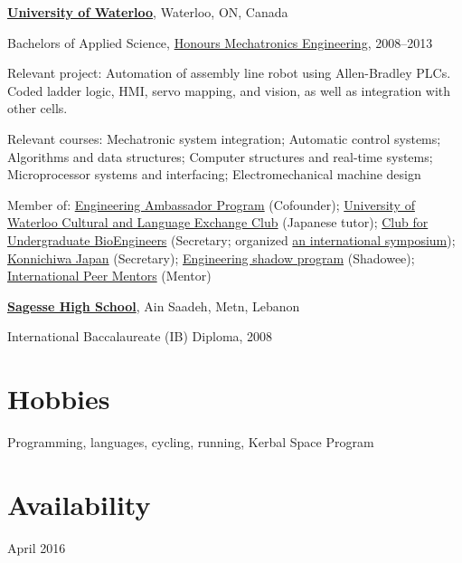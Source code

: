 \documentclass[10pt, a4paper]{article}
\begin{document}
\halfblankline

\href{https://www.uwaterloo.ca/}{\textbf{University of Waterloo}}, Waterloo, ON, Canada
\begin{outerlist}
\item[] Bachelors of Applied Science, \href{https://uwaterloo.ca/mechanical-mechatronics-engineering/program-overview}{Honours Mechatronics Engineering}, 2008--2013
  \begin{innerlist}
  \item Relevant project: Automation of assembly line robot using Allen-Bradley PLCs.
    Coded ladder logic, HMI, servo mapping, and vision, as well as integration with other cells.
  \item Relevant courses:
	  Mechatronic system integration;
	  Automatic control systems;
	  Algorithms and data structures;
	  Computer structures and real-time systems;
	  Microprocessor systems and interfacing;
	  Electromechanical machine design
  \item Member of:
	  \href{https://uwaterloo.ca/engineering-student-ambassadors/}{Engineering Ambassador Program} (Cofounder);
	  \href{http://uwclec.webs.com/}{University of Waterloo Cultural and Language Exchange Club} (Japanese tutor);
	  \href{http://cube.uwaterloo.ca/}{Club for Undergraduate BioEngineers} (Secretary; organized \href{http://cube.uwaterloo.ca/Symposium%202010%20web%20site/symp%202010.htm}{an international symposium});
	  \href{http://www.uwkonja.com/}{Konnichiwa Japan} (Secretary);
	  \href{https://uwaterloo.ca/engineering-student-ambassadors/shadow-program}{Engineering shadow program} (Shadowee);
	  \href{https://uwaterloo.ca/international-students/programs/international-peer-mentors}{International Peer Mentors} (Mentor)
  \end{innerlist}
\end{outerlist}

\halfblankline

\href{http://sagessehs.edu.lb/}{\textbf{Sagesse High School}}, Ain Saadeh, Metn, Lebanon
\begin{outerlist}
\item[] International Baccalaureate (IB) Diploma, 2008
\end{outerlist}

\section{Hobbies}
Programming, languages, cycling, running, Kerbal Space Program

\section{Availability}
April 2016
\end{document}
